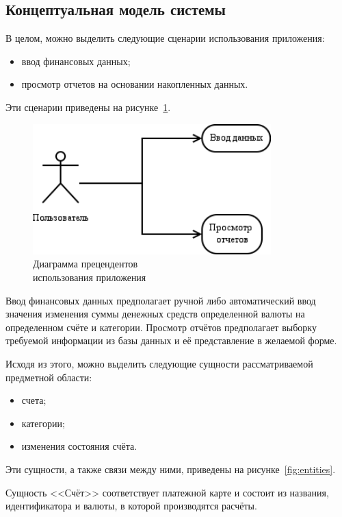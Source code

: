 \pagebreak
\subsection{Концептуальная модель системы}

В целом, можно выделить следующие сценарии использования приложения:
\begin{itemize}
  \item ввод финансовых данных;
  \item просмотр отчетов на основании накопленных данных.
\end{itemize}

Эти сценарии приведены на рисунке~\ref{fig:use_cases}.

\begin{figure}[h!]
  \centering
  \includegraphics[width=92mm]{pic/use_cases}
  \caption{Диаграмма прецендентов \\ использования приложения}
  \label{fig:use_cases}
\end{figure}

Ввод финансовых данных предполагает ручной либо автоматический ввод
значения изменения суммы денежных средств определенной валюты
на определенном счёте и категории.
Просмотр отчётов предполагает выборку требуемой информации из базы
данных и её представление в желаемой форме.

Исходя из этого, можно выделить следующие сущности рассматриваемой
предметной области:
\begin{itemize}
\item счета;
\item категории;
\item изменения состояния счёта.
\end{itemize}

Эти сущности, а также связи между ними, приведены на рисунке~\ref{fig:entities}.

Сущность <<Счёт>> соответствует платежной карте
и состоит из названия, идентификатора и валюты, в которой производятся расчёты.

